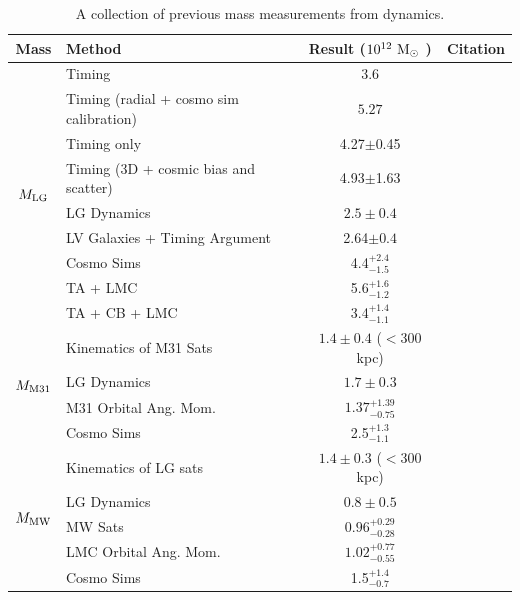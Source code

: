 \documentclass[twocolumn]{aastex631}
\newcommand{\mlg}{\ensuremath{M_{\rm LG}}}
\newcommand{\mmto}{\ensuremath{M_{\rm M31}}}
\newcommand{\mmw}{\ensuremath{M_{\rm MW}}}
\begin{document}
\begin{table}
  \centering
  \begin{tabular}{clc|c}
    \hline\hline
    Mass & Method & Result ($ 10^{12}~\mathrm{M}_\odot$ ) & Citation \\\hline
    \multirow{9}{*}{\mlg}  &Timing & $3.6$ & \cite{Lynden-Bell:1981} \\
    &Timing (radial + cosmo sim calibration)  & $5.27$& \cite{LiWhite2008} \\
    &{Timing only} & {4.27$\pm$0.45} & \cite{vdm2012} \\
    &{Timing (3D + cosmic bias and scatter)} & {4.93$\pm$1.63} & \cite{vdm2012} \\
    & LG Dynamics &$2.5\pm0.4$ & \cite{Diaz2014}\\
    &{LV Galaxies + Timing Argument} & {2.64$\pm0.4$} & \cite{Penarrubia2016} \\
    & Cosmo Sims & 4.4$^{+2.4}_{-1.5}$ & \cite{Zhai2020}\\
    & TA + LMC & 5.6$^{+1.6}_{-1.2}$ & \cite{Benisty2022}\\
    & TA + CB + LMC & 3.4$^{+1.4}_{-1.1}$ & \cite{Benisty2022}\\
    
    \hline
    \multirow{4}{*}{\mmto}& Kinematics of M31 Sats & $1.4 \pm 0.4$ ($<$300 kpc) & \cite{Watkins2010}\\
    & LG Dynamics &$1.7\pm0.3$ & \cite{Diaz2014}\\
    & M31 Orbital Ang. Mom. & $1.37^{+1.39}_{-0.75}$ & \cite{Patel2017b}\\
    & Cosmo Sims & 2.5$^{+1.3}_{-1.1}$ & \cite{Zhai2020}\\

    \hline
    \multirow{5}{*}{\mmw}&  Kinematics of LG sats & $1.4 \pm 0.3$ ($<$300 kpc) & \cite{Watkins2010}\\
    
    & LG Dynamics &$0.8\pm0.5$ & \cite{Diaz2014}\\
    & MW Sats & $0.96^{+0.29}_{-0.28}$ & \cite{Patel2017b}\\
    & LMC Orbital Ang. Mom. & $1.02^{+0.77}_{-0.55}$ & \cite{Patel2017b}\\
    & Cosmo Sims & 1.5$^{+1.4}_{-0.7}$ & \cite{Zhai2020} \\
  \hline\hline
  \end{tabular}
  \caption{\label{table:masses}A collection of previous mass measurements from dynamics.}
\end{table}
\end{document}
